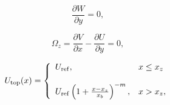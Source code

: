 \begin{equation} 
    \frac{\partial W}{\partial y}=0,
\label{eq:BC_dWdy}
\end{equation}

\begin{equation} 
    \Omega_z = \frac{\partial V}{\partial x} - \frac{\partial U}{\partial y}=0,
\label{eq:BC_Vort_z}
\end{equation}

\begin{equation}
    U_{\rm top}(x)= \left\{ \begin{array}{ll}
             U_{\rm ref}, &  x \leq x_z \\
             \\ U_{\rm ref}\left( 1 + \frac{x - x_{z}}{x_{b}} \right)^{-m}, & x > x_z,
             \end{array}
   \right.
\label{eq:BC_APG_U}
\end{equation}





